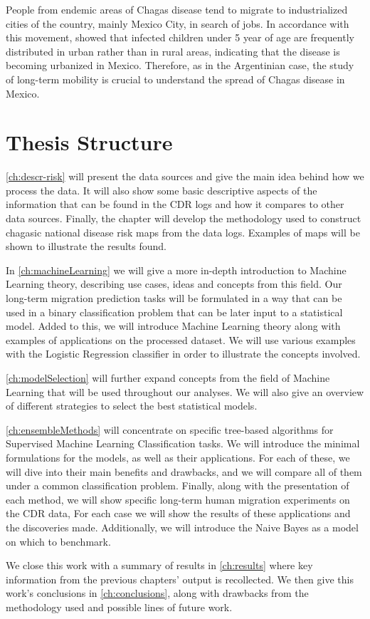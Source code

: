 People from endemic areas of Chagas disease tend to migrate to industrialized cities of the country, mainly Mexico City, in search of jobs.
In accordance with this movement, \citep{guzman2001epidemiology} showed
that infected children under 5 year of age are frequently distributed in urban
rather than in rural areas, indicating that the disease is becoming urbanized in
Mexico.
Therefore, as in the Argentinian case, the study of long-term mobility is crucial to understand the spread of Chagas disease in Mexico.



\section{Thesis Structure}


\cref{ch:descr-risk} will present the data sources and give the main idea behind how we process the data.
It will also show some basic descriptive aspects of the information that can be found in the CDR logs and how it compares to other data sources.
Finally, the chapter will develop the methodology used to construct chagasic national disease risk maps from the data logs.
Examples of maps will be shown to illustrate the results found.

In \cref{ch:machineLearning} we will give a more in-depth introduction to Machine Learning theory, describing use cases, ideas and concepts from this field.
Our long-term migration prediction tasks will be formulated in a way that can be used in a binary classification problem that can be later input to a statistical model.
Added to this, we will introduce Machine Learning theory along with examples of applications on the processed dataset.
We will use various examples with the Logistic Regression classifier in order to illustrate the concepts involved.

\cref{ch:modelSelection} will further expand concepts from the field of Machine Learning that will be used throughout our analyses.
We will also give an overview of different strategies to select the best statistical models.

\cref{ch:ensembleMethods} will concentrate on specific tree-based algorithms for Supervised Machine Learning Classification tasks.
We will introduce the minimal formulations for the models, as well as their applications.
For each of these, we will dive into their main benefits and drawbacks, and we will compare all of them under a common classification problem.
Finally, along with the presentation of each method, we will show specific long-term human migration experiments on the CDR data,
For each case we will show the results of these applications and the discoveries made.
Additionally, we will introduce the Naive Bayes as a model on which to benchmark.

We close this work with a summary of results in \cref{ch:results} where key information from the previous chapters' output is recollected.
We then give this work's conclusions in \cref{ch:conclusions}, along with drawbacks from the methodology used and possible lines of future work.



